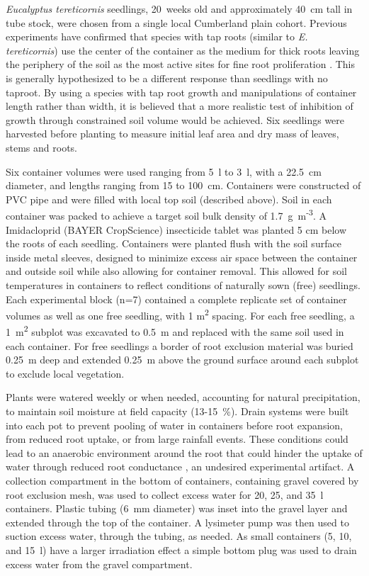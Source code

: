 \documentclass[a4paper]{article}\usepackage[]{graphicx}\usepackage[]{color}
\begin{document}
\textit{Eucalyptus tereticornis} seedlings, 20~weeks old and approximately 40~cm tall in tube stock, were chosen from a single local Cumberland plain cohort. Previous experiments have confirmed that species with tap roots (similar to \textit{E. tereticornis}) use the center of the container as the medium for thick roots leaving the periphery of the soil as the most active sites for fine root proliferation \citep{biran1980a,biran1980b}. This is generally hypothesized to be a different response than seedlings with no taproot. By using a species with tap root growth and manipulations of container length rather than width, it is believed that a more realistic test of inhibition of growth through constrained soil volume would be achieved. Six seedlings were harvested before planting to measure initial leaf area and dry mass of leaves, stems and roots.

Six container volumes were used ranging from 5~l to 3~l, with a 22.5~cm diameter, and lengths ranging from 15 to 100~cm. Containers were constructed of PVC pipe and were filled with local top soil (described above). Soil in each container was packed to achieve a target soil bulk density of 1.7~g~m\textsuperscript{-3}. A Imidacloprid (BAYER CropScience) insecticide tablet was planted 5 cm below the roots of each seedling. Containers were planted flush with the soil surface inside metal sleeves, designed to minimize excess air space between the container and outside soil while also allowing for container removal. This allowed for soil temperatures in containers to reflect conditions of naturally sown (free) seedlings. Each experimental block (n=7) contained a complete replicate set of container volumes as well as one free seedling, with 1 m\textsuperscript{2} spacing. For each free seedling, a 1~m\textsuperscript{2} subplot was excavated to 0.5~m and replaced with the same soil used in each container. For free seedlings a border of root exclusion material was buried 0.25~m deep and extended 0.25~m above the ground surface around each subplot to exclude local vegetation.

Plants were watered weekly or when needed, accounting for natural precipitation, to maintain soil moisture at field capacity (13-15~\%). Drain systems were built into each pot to prevent pooling of water in containers before root expansion, from reduced root uptake, or from large rainfall events. These conditions could lead to an anaerobic environment around the root that could hinder the uptake of water through reduced root conductance \citep{poorter2009causes}, an undesired experimental artifact. A collection compartment in the bottom of containers, containing gravel covered by root exclusion mesh, was used to collect excess water for 20, 25, and 35~l containers. Plastic tubing (6~mm diameter) was inset into the gravel layer and extended through the top of the container. A lysimeter pump was then used to suction excess water, through the tubing, as needed. As small containers (5, 10, and 15~l) have a larger irradiation effect a simple bottom plug was used to drain excess water from the gravel compartment.  
\end{document}
